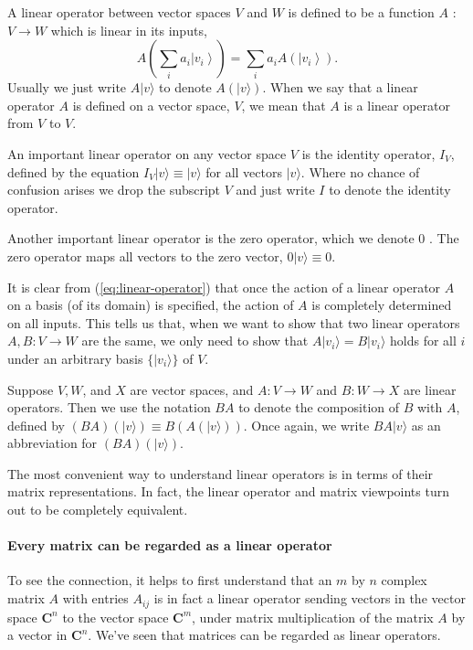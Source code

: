 A linear operator between vector spaces $V$ and $W$ is defined to be a function $A$ : $V \rightarrow W$ which is linear in its inputs,
\begin{equation}\label{eq:linear-operator}
A\left(\sum_{i} a_{i}\left|v_{i}\right\rangle\right)=\sum_{i} a_{i} A\left(\left|v_{i}\right\rangle\right).
\end{equation}
Usually we just write $A|v\rangle$ to denote $A(|v\rangle)$. When we say that a linear operator $A$ is defined on a vector space, $V$, we mean that $A$ is a linear operator from $V$ to $V$. 

\begin{example}
    An important linear operator on any vector space $V$ is the identity operator, $I_{V}$, defined by the equation $I_{V}|v\rangle \equiv|v\rangle$ for all vectors $|v\rangle$. Where no chance of confusion arises we drop the subscript $V$ and just write $I$ to denote the identity operator. 
\end{example}

\begin{example}
    Another important linear operator is the zero operator, which we denote 0 . The zero operator maps all vectors to the zero vector, $0|v\rangle \equiv 0$. 
\end{example}

It is clear from (\ref{eq:linear-operator}) that once the action of a linear operator $A$ on a basis (of its domain) is specified, the action of $A$ is completely determined on all inputs. This tells us that, when we want to show that two linear operators $A,B:V \rightarrow W$ are the same, we only need to show that $A |v_{i}\rangle = B|v_{i}\rangle$ holds for all $i$ under an arbitrary basis $\{|v_{i}\rangle\}$ of $V.$

Suppose $V, W$, and $X$ are vector spaces, and $A: V \rightarrow W$ and $B: W \rightarrow X$ are linear operators. Then we use the notation $B A$ to denote the composition of $B$ with $A$, defined by $(B A)(|v\rangle) \equiv B(A(|v\rangle))$. Once again, we write $B A|v\rangle$ as an abbreviation for $(B A)(|v\rangle)$.

The most convenient way to understand linear operators is in terms of their matrix representations. In fact, the linear operator and matrix viewpoints turn out to be completely equivalent. 

\paragraph{Every matrix can be regarded as a linear operator}
To see the connection, it helps to first understand that an $m$ by $n$ complex matrix $A$ with entries $A_{i j}$ is in fact a linear operator sending vectors in the vector space $\mathbf{C}^{n}$ to the vector space $\mathbf{C}^{m}$, under matrix multiplication of the matrix $A$ by a vector in $\mathbf{C}^{n}$. We've seen that matrices can be regarded as linear operators.

